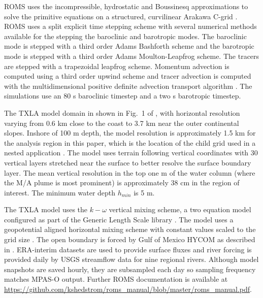 ROMS uses the incompressible, hydrostatic and Boussinesq approximations to solve the primitive equations on a structured, curvilinear Arakawa C-grid \citep{Arakawa_1977, shchepetkin2005regional}. ROMS uses a split explicit time stepping scheme with several numerical methods available for the stepping the baroclinic and barotropic modes. The baroclinic mode is stepped with a third order Adams Bashforth scheme and the barotropic mode is stepped with a third order Adams Moulton-Leapfrog scheme. The tracers are stepped with a trapezoidal leapfrog scheme. Momentum advection is computed using a third order upwind scheme and tracer advection is computed with the multidimensional positive definite advection transport algorithm \citep{Smolarkiewicz_1998}. The simulations use an 80 s baroclinic timestep and a two s barotropic timestep. 

The TXLA model domain in shown in Fig.~1 of \cite{Schlichting23}, with horizontal resolution varying from 0.6 km close to the coast to 3.7 km near the outer continental slopes. Inshore of 100 m depth, the model resolution is approximately 1.5 km for the analysis region in this paper, which is the location of the child grid used in a nested application \citep{Schlichting23}. The model uses terrain following vertical coordinates with 30 vertical layers stretched near the surface to better resolve the surface boundary layer. The mean vertical resolution in the top one m of the water column (where the M/A plume is most prominent) is approximately 38 cm in the region of interest. The minimum water depth $h_{min}$ is 5 m. 

The TXLA model uses the $k-\omega$ vertical mixing scheme, a two equation model configured as part of the Generic Length Scale library \citep{umlauf2003extending, Warner_2005}. The model uses a geopotential aligned horizontal mixing scheme with constant values scaled to the grid size \citep[see Section 3.2 of ][]{Schlichting23}. The open boundary is forced by Gulf of Mexico HYCOM as described in \citep{Zhang_2012_forecast}. ERA-interim datasets are used to provide surface fluxes \citep{Dee_2011} and river forcing is provided daily by USGS streamflow data for nine regional rivers. Although model snapshots are saved hourly, they are subsampled each day so sampling frequency matches MPAS-O output. Further ROMS documentation is available at \url{https://github.com/kshedstrom/roms_manual/blob/master/roms_manual.pdf}.

